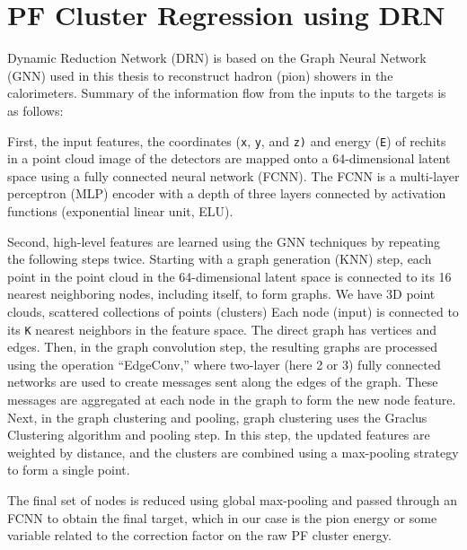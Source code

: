 \section{PF Cluster Regression using DRN}
Dynamic Reduction Network (DRN)%
is based on the Graph Neural Network (GNN) used in this thesis to reconstruct hadron (pion) showers in the calorimeters.
 Summary of the information flow from the inputs to the targets is as follows:

First, the input features, the coordinates ({\tt x}, {\tt y}, and {\tt z)} and energy ({\tt E}) of rechits in a point cloud image of the detectors are mapped onto a 64-dimensional latent space using a fully connected neural network (FCNN).
The FCNN is a multi-layer perceptron (MLP) encoder with a depth of three layers connected by activation functions (exponential linear unit, ELU).

Second, high-level features are learned using the GNN techniques by repeating the following steps twice.
Starting with a graph generation (KNN) step, each point in the point cloud in the 64-dimensional latent space is connected to its 16 nearest neighboring nodes, including itself, to form graphs.
We have 3D point clouds, scattered collections of points (clusters)%
 Each node (input) is connected to its {\tt K} nearest neighbors in the feature space. The direct graph has vertices and edges. %
Then, in the graph convolution step, the resulting graphs are processed using the operation “EdgeConv,” where two-layer (here 2 or 3) fully connected networks are used to create messages sent along the edges of the graph.
These messages are aggregated at each node in the graph to form the new node feature. %
Next, in the graph clustering and pooling, graph clustering uses the Graclus Clustering algorithm and pooling step.
In this step, the updated features are weighted by distance, and the clusters are combined using a max-pooling strategy to form a single point.

The final set of nodes is reduced using global max-pooling and passed through an FCNN to obtain the final target, which in our case is the pion energy or some variable related to the correction factor on the raw PF cluster energy.

